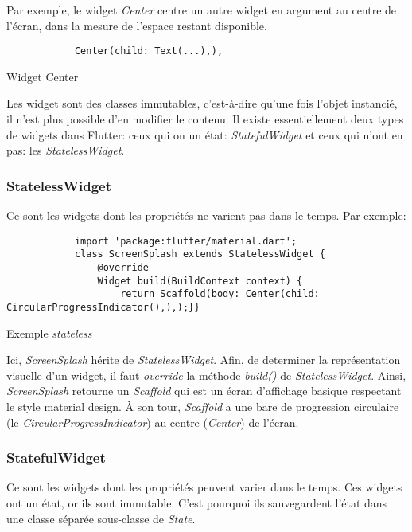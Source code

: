     Par exemple, le widget \textit{Center} centre un autre widget en argument au centre de l'écran, dans la mesure de l'espace restant disponible.
    \begin{listing}[h]
        \begin{verbatim}
            Center(child: Text(...),),
        \end{verbatim}
    \caption{Widget Center}
    \label{code:center}
    \end{listing}

    Les widget sont des classes immutables, c'est-à-dire qu'une fois l'objet instancié, il n'est plus possible d'en modifier le contenu.
    Il existe essentiellement deux types de widgets dans Flutter: ceux qui on un état: \textit{StatefulWidget} et ceux qui n'ont en pas:
    les \textit{StatelessWidget}.

    \subsubsection*{StatelessWidget}
    Ce sont les widgets dont les propriétés ne varient pas dans le temps. Par exemple:

    \begin{listing}[h]
        \begin{verbatim}
            import 'package:flutter/material.dart';
            class ScreenSplash extends StatelessWidget {
                @override
                Widget build(BuildContext context) {
                    return Scaffold(body: Center(child: CircularProgressIndicator(),),);}}
        \end{verbatim}
    \caption{Exemple \textit{stateless}}
    \label{code:statelessExample}
    \end{listing}

    Ici, \textit{ScreenSplash} hérite de \textit{StatelessWidget}. Afin, de determiner la représentation visuelle d'un widget,
    il faut \textit{override} la méthode \textit{build()} de \textit{StatelessWidget}. Ainsi, \textit{ScreenSplash} retourne un \textit{Scaffold}
    qui est un écran d'affichage basique respectant le style material design. À son tour, 
    \textit{Scaffold} a une bare de progression circulaire (le \textit{CircularProgressIndicator}) au centre (\textit{Center}) de l'écran.
    \newpage
    \subsubsection*{StatefulWidget}
    Ce sont les widgets dont les propriétés peuvent varier dans le temps. Ces widgets ont un état, or ils sont immutable. C'est pourquoi ils sauvegardent
    l'état dans une classe séparée sous-classe de \textit{State}.

